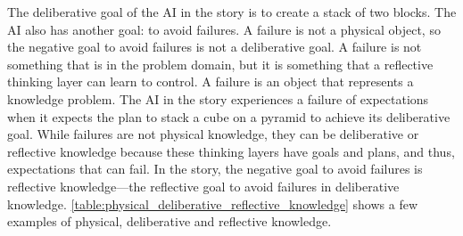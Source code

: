 The deliberative goal of the AI in the story is to create a stack of
two blocks.  The AI also has another goal: to avoid failures.  A
failure is not a physical object, so the negative goal to avoid
failures is not a deliberative goal.  A failure is not something that
is in the problem domain, but it is something that a reflective
thinking layer can learn to control.  A failure is an object that
represents a knowledge problem.  The AI in the story experiences a
failure of expectations when it expects the plan to stack a cube on a
pyramid to achieve its deliberative goal.  While failures are not
physical knowledge, they can be deliberative or reflective knowledge
because these thinking layers have goals and plans, and thus,
expectations that can fail.  In the story, the negative goal to avoid
failures is reflective knowledge---the reflective goal to avoid
failures in deliberative knowledge.
{\autoref{table:physical_deliberative_reflective_knowledge}} shows a
few examples of physical, deliberative and reflective knowledge.

